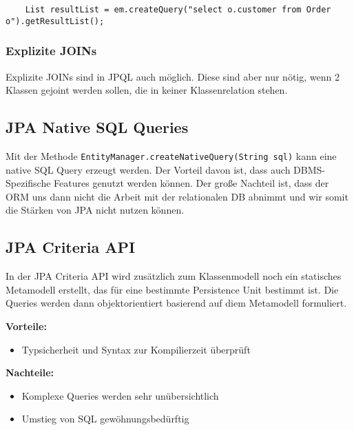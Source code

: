 \begin{lstlisting}
    List resultList = em.createQuery("select o.customer from Order o").getResultList();
\end{lstlisting}

\subsubsection{Explizite JOINs}

Explizite JOINs sind in JPQL auch möglich. Diese sind aber nur nötig, wenn 2 Klassen gejoint werden sollen, die in keiner Klassenrelation stehen.

\subsection{JPA Native SQL Queries}

Mit der Methode \lstinline{EntityManager.createNativeQuery(String sql)} kann eine native SQL Query erzeugt werden. Der Vorteil davon ist, dass auch DBMS-Spezifische Features genutzt werden können. Der große Nachteil ist, dass der ORM uns dann nicht die Arbeit mit der relationalen DB abnimmt und wir somit die Stärken von JPA nicht nutzen können.

\subsection{JPA Criteria API}

In der JPA Criteria API wird zusätzlich zum Klassenmodell noch ein statisches Metamodell erstellt, das für eine bestimmte Persistence Unit bestimmt ist. Die Queries werden dann objektorientiert basierend auf diem Metamodell formuliert.

\textbf{Vorteile:}

\begin{itemize}
    \item Typsicherheit und Syntax zur Kompilierzeit überprüft
\end{itemize}

\textbf{Nachteile:}

\begin{itemize}
    \item Komplexe Queries werden sehr unübersichtlich
    \item Umstieg von SQL gewöhnungsbedürftig
\end{itemize}